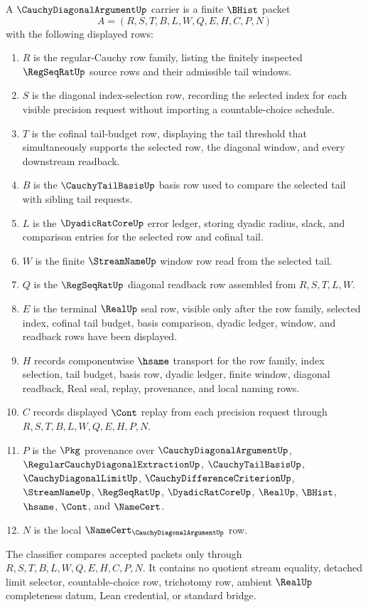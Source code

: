 \begin{definition}
\label{def:cauchy-diagonal-argument-carrier}
A $\CauchyDiagonalArgumentUp$ carrier is a finite $\BHist$ packet
$$
A=(R,S,T,B,L,W,Q,E,H,C,P,N)
$$
with the following displayed rows:
\begin{enumerate}
\item $R$ is the regular-Cauchy row family, listing the finitely inspected $\RegSeqRatUp$ source rows and their admissible tail windows.
\item $S$ is the diagonal index-selection row, recording the selected index for each visible precision request without importing a countable-choice schedule.
\item $T$ is the cofinal tail-budget row, displaying the tail threshold that simultaneously supports the selected row, the diagonal window, and every downstream readback.
\item $B$ is the $\CauchyTailBasisUp$ basis row used to compare the selected tail with sibling tail requests.
\item $L$ is the $\DyadicRatCoreUp$ error ledger, storing dyadic radius, slack, and comparison entries for the selected row and cofinal tail.
\item $W$ is the finite $\StreamNameUp$ window row read from the selected tail.
\item $Q$ is the $\RegSeqRatUp$ diagonal readback row assembled from $R,S,T,L,W$.
\item $E$ is the terminal $\RealUp$ seal row, visible only after the row family, selected index, cofinal tail budget, basis comparison, dyadic ledger, window, and readback rows have been displayed.
\item $H$ records componentwise $\hsame$ transport for the row family, index selection, tail budget, basis row, dyadic ledger, finite window, diagonal readback, Real seal, replay, provenance, and local naming rows.
\item $C$ records displayed $\Cont$ replay from each precision request through $R,S,T,B,L,W,Q,E,H,P,N$.
\item $P$ is the $\Pkg$ provenance over $\CauchyDiagonalArgumentUp$, $\RegularCauchyDiagonalExtractionUp$, $\CauchyTailBasisUp$, $\CauchyDiagonalLimitUp$, $\CauchyDifferenceCriterionUp$, $\StreamNameUp$, $\RegSeqRatUp$, $\DyadicRatCoreUp$, $\RealUp$, $\BHist$, $\hsame$, $\Cont$, and $\NameCert$.
\item $N$ is the local $\NameCert_{\CauchyDiagonalArgumentUp}$ row.
\end{enumerate}
The classifier compares accepted packets only through $R,S,T,B,L,W,Q,E,H,C,P,N$. It contains no quotient stream equality, detached limit selector, countable-choice row, trichotomy row, ambient $\RealUp$ completeness datum, Lean credential, or standard bridge.
\end{definition}

